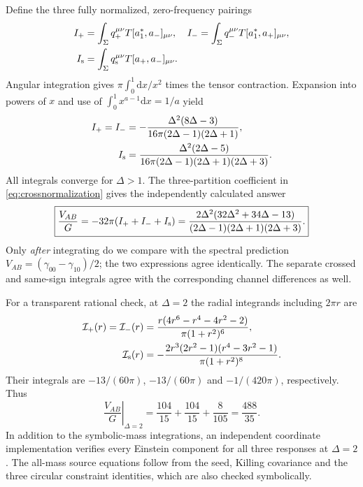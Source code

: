 \documentclass[11pt,a4paper]{article}
\numberwithin{equation}{section}
\theoremstyle{remark}\newtheorem{remark}[theorem]{Remark}
\newcommand{\dd}{\mathrm d}
\begin{document}
Define the three fully normalized, zero-frequency pairings
\begin{align}
 I_+&=\int_\Sigma q_+^{\mu\nu}T[a_1^*,a_-]_{\mu\nu},&
 I_-&=\int_\Sigma q_-^{\mu\nu}T[a_1^*,a_+]_{\mu\nu},\nonumber\\
 I_{\rm s}&=\int_\Sigma q_{\rm s}^{\mu\nu}T[a_+,a_-]_{\mu\nu}.
\end{align}
Angular integration gives $\pi\int_0^1\dd x/x^2$ times the tensor contraction. Expansion into powers of $x$ and use of $\int_0^1x^{a-1}\dd x=1/a$ yield
\begin{align}
 I_+=I_-&=-\frac{\Delta^2(8\Delta-3)}{16\pi(2\Delta-1)(2\Delta+1)},\nonumber\\
 I_{\rm s}&=\frac{\Delta^2(2\Delta-5)}{16\pi(2\Delta-1)(2\Delta+1)(2\Delta+3)}.
 \label{eq:ABintegrals}
\end{align}
All integrals converge for $\Delta>1$. The three-partition coefficient in \eqref{eq:crossnormalization} gives the independently calculated answer
\begin{equation}
 \boxed{\frac{V_{AB}}G=-32\pi(I_++I_-+I_{\rm s})
 =\frac{2\Delta^2(32\Delta^2+34\Delta-13)}
 {(2\Delta-1)(2\Delta+1)(2\Delta+3)}.}
 \label{eq:VAB}
\end{equation}
Only \emph{after} integrating do we compare with the spectral prediction
$V_{AB}=(\gamma_{00}-\gamma_{10})/2$; the two expressions agree identically. The separate crossed and same-sign integrals agree with the corresponding channel differences as well.

For a transparent rational check, at $\Delta=2$ the radial integrands including $2\pi r$ are
\begin{align}
 \mathcal I_+(r)=\mathcal I_-(r)
 &=\frac{r(4r^6-r^4-4r^2-2)}{\pi(1+r^2)^6},\nonumber\\
 \mathcal I_{\rm s}(r)
 &=-\frac{2r^3(2r^2-1)(r^4-3r^2-1)}{\pi(1+r^2)^8}.
\end{align}
Their integrals are $-13/(60\pi)$, $-13/(60\pi)$ and $-1/(420\pi)$, respectively. Thus
\begin{equation}
 \left.\frac{V_{AB}}G\right|_{\Delta=2}
 =\frac{104}{15}+\frac{104}{15}+\frac8{105}=\frac{488}{35}.
\end{equation}
In addition to the symbolic-mass integrations, an independent coordinate implementation verifies every Einstein component for all three responses at $\Delta=2$. The all-mass source equations follow from the seed, Killing covariance and the three circular constraint identities, which are also checked symbolically.
\end{document}
